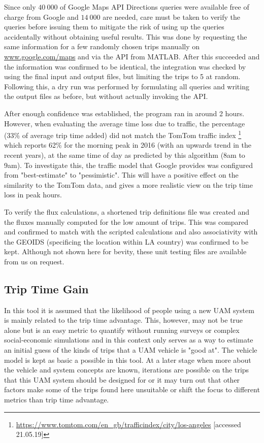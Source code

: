 Since only $40\ 000$ of Google Maps API Directions queries were available free of charge from Google and $14\ 000$ are needed, care must be taken to verify the queries before issuing them to mitigate the risk of using up the queries accidentally without obtaining useful results. This was done by requesting the same information for a few randomly chosen trips manually on \url{www.google.com/maps} and via the API from MATLAB. After this succeeded and the information was confirmed to be identical, the integration was checked by using the final input and output files, but limiting the trips to 5 at random. Following this, a dry run was performed by formulating all queries and writing the output files as before, but without actually invoking the API. 

After enough confidence was established, the program ran in around 2 hours. However, when evaluating the average time loss due to traffic, the percentage (33\% of average trip time added) did not match the TomTom traffic index \footnote{\url{https://www.tomtom.com/en_gb/trafficindex/city/los-angeles} [accessed 21.05.19]} which reports 62\% for the morning peak in 2016 (with an upwards trend in the recent years), at the same time of day as predicted by this algorithm (8am to 9am). To investigate this, the traffic model that Google provides was configured from "best-estimate" to "pessimistic". This will have a positive effect on the similarity to the TomTom data, and gives a more realistic view on the trip time loss in peak hours.

To verify the flux calculations, a shortened trip definitions file was created and the fluxes manually computed for the low amount of trips. This was compared and confirmed to match with the scripted calculations and also associativity with the GEOIDS (specificing the location within LA country) was confirmed to be kept. Although not shown here for bevity, these unit testing files are available from us on request.



\iffalse
\subsection{Trip Time Gain}

In this tool it is assumed that the likelihood of people using a new UAM system is mainly related to the trip time advantage. This, however, may not be true alone but is an easy metric to quantify without running surveys or complex social-economic simulations and in this context only serves as a way to estimate an initial guess of the kinds of trips that a UAM vehicle is "good at". The vehicle model is kept as basic a possible in this tool. At a later stage when more about the vehicle and system concepts are known, iterations are possible on the trips that this UAM system should be designed for or it may turn out that other factors make some of the trips found here unsuitable or shift the focus to different metrics than trip time advantage.

